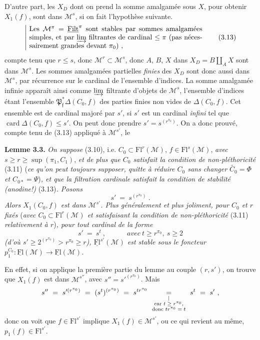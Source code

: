 \documentclass[11pt]{article}
\newcommand{\printedpage}[1]{\marginpar{\footnotesize p.~#1}}
\newcommand{\msp}[1]{\marginpar{\footnotesize [#1]}}
\newcommand{\M}{\mathcal{M}}
\newcommand{\Fl}{\mathrm{Fl}}
\newcommand{\uFl}{\underline{\mathrm{Fl}}}
\newcommand{\uFilt}{\underline{\mathrm{Filt}}}
\newcommand{\card}{\operatorname{card}}
\begin{document}
D'autre part, les $X_D$ dont on prend la somme amalgamée sous $X$, pour obtenir $X_1(f)$, sont dans $\M^s$, si on fait l'hypothèse suivante. \msp{page 25}
\[
\left|\ \parbox{0.72\linewidth}{Les $\M^\pi=\uFilt^\pi$ sont stables par sommes amalgamées simples, et par $\varinjlim$ filtrantes de cardinal $\leq\pi$ (pas nécessairement grandes devant $\pi_0$) ,}\right. \tag*{(3.13)}
\]
compte tenu que $r\leq s$, donc $\M^r\subset\M^s$, donc $A$, $B$, $X$ dans $X_D=B\amalg_A X$ sont dans $\M^s$. Les sommes amalgamées partielles \textit{finies} des $X_D$ sont donc aussi dans $\M^s$, par récurrence sur le cardinal de l'ensemble d'indices. La somme amalgamée infinie apparaît ainsi comme $\varinjlim$ filtrante d'objets de $\M^s$, l'ensemble d'indices étant l'ensemble $\mathfrak{P}^*_{\mathfrak{f}}\Delta(C_0,f)$ des parties finies non vides de $\Delta(C_0,f)$. Cet ensemble est de cardinal majoré par $s'$, si $s'$ est un cardinal \textit{infini} tel que $\card\Delta(C_0,f)\leq s'$. On peut donc prendre $s'=s^{(r^{\pi_0})}$. On a donc prouvé, compte tenu de (3.13) appliqué à $\M^{s'}$, le %

\textbf{Lemme 3.3.} \textit{On suppose} \textup{(3.10), i.e.} $C_0\subset\Fl^r(\M)$, $f\in\Fl^s(\M)$, \textit{avec} $s\geq r\geq\sup(\pi_1,C_1)$, \textit{et de plus que $C_0$ satisfait la condition de non-pléthoricité} \textup{(3.11)} \textup{(}\textit{ce qu'on peut toujours supposer, quitte à réduire $C_0$ sans changer $\widetilde{C_0}=\Phi$ et $C_{0*}=\Psi$}\textup{)}\textit{, et que la filtration cardinale satisfait la condition de stabilité (anodine!)} \textup{(3.13)}\textit{. Posons}
\[
s'\ =\ s^{(r^{\pi_0})}\ . \tag*{(3.14)}
\]
\textit{Alors $X_1(C_0,f)$ est dans $\M^{s'}$. Plus généralement et plus joliment, pour $C_0$ et $r$ fixés} \textup{(}\textit{avec $C_0\subset\Fl^r(\M)$ et satisfaisant la condition de non-pléthoricité} \textup{(3.11)} \textit{relativement à $r$}\textup{)}\textit{, pour tout cardinal} \msp{page 26} \textit{de la forme}
\[
s'\ =\ s^t\ ,\qquad\quad\textit{avec}\ t\geq r^{\pi_0},\ s\geq 2 \tag*{(3.15)}
\]
\textit{(d'où $s'\geq 2^{(r^{\pi_0})}>r^{\pi_0}\geq r$), $\uFl^{s'}(\M)$ est stable sous le foncteur $p_1^{C_0}:\uFl(\M)\longrightarrow\uFl(\M)$.}

En effet, si on applique la première partie du lemme au couple $(r,s')$, on trouve que $X_1(f)$ est dans $\M^{s''}$, avec $s''=s'^{(r^{\pi_0})}$. Mais
\[
s''\ =\ s'^{(r^{\pi_0})}\ =\ (s^t)^{(r^{\pi_0})}\ =\ s^{tr^{\pi_0}}\ \underset{\substack{\vert\\ \text{\scriptsize car $t\geq r^{\pi_0}$,}\\ \text{\scriptsize donc $tr^{\pi_0}=t$}}}{=}\ s^t\ =\ s'\ ,
\]
\printedpage{18}
donc on voit que $f\in\Fl^{s'}$ implique $X_1(f)\in\M^{s'}$, ou ce qui revient au même, $p_1(f)\in\Fl^{s'}$.
\end{document}
